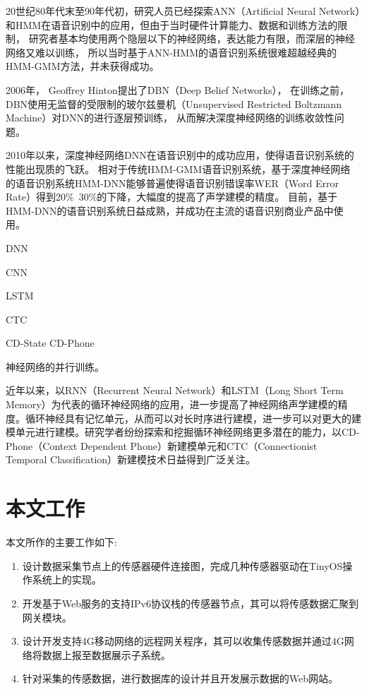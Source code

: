 20世纪80年代末至90年代初，研究人员已经探索ANN（Artificial Neural Network）和HMM在语音识别中的应用，但由于当时硬件计算能力、数据和训练方法的限制，
研究者基本均使用两个隐层以下的神经网络，表达能力有限，而深层的神经网络又难以训练，
所以当时基于ANN-HMM的语音识别系统很难超越经典的HMM-GMM方法，并未获得成功。

2006年， Geoffrey Hinton提出了DBN（Deep Belief Networks），
在训练之前，DBN使用无监督的受限制的玻尔兹曼机（Unsupervised Restricted Boltzmann Machine）对DNN的进行逐层预训练，
从而解决深度神经网络的训练收敛性问题。

2010年以来，深度神经网络DNN在语音识别中的成功应用，使得语音识别系统的性能出现质的飞跃。
相对于传统HMM-GMM语音识别系统，基于深度神经网络
的语音识别系统HMM-DNN能够普遍使得语音识别错误率WER（Word Error Rate）得到20\%~30\%的下降，大幅度的提高了声学建模的精度。
目前，基于HMM-DNN的语音识别系统日益成熟，并成功在主流的语音识别商业产品中使用。

DNN

CNN

LSTM

CTC

CD-State CD-Phone

神经网络的并行训练。



近年以来，以RNN（Recurrent Neural Network）和LSTM（Long Short Term Memory）为代表的循环神经网络的应用，进一步提高了神经网络声学建模的精度。循环神经具有记忆单元，从而可以对长时序进行建模，进一步可以对更大的建模单元进行建模。研究学者纷纷探索和挖掘循环神经网络更多潜在的能力，以CD-Phone（Context Dependent Phone）新建模单元和CTC（Connectionist  Temporal Classification）新建模技术日益得到广泛关注。


\section{本文工作}

本文所作的主要工作如下:
\begin{enumerate}
\item 设计数据采集节点上的传感器硬件连接图，完成几种传感器驱动在TinyOS操作系统上的实现。
\item 开发基于Web服务的支持IPv6协议栈的传感器节点，其可以将传感数据汇聚到网关模块。
\item 设计开发支持4G移动网络的远程网关程序，其可以收集传感数据并通过4G网络将数据上报至数据展示子系统。
\item 针对采集的传感数据，进行数据库的设计并且开发展示数据的Web网站。
\end{enumerate}

